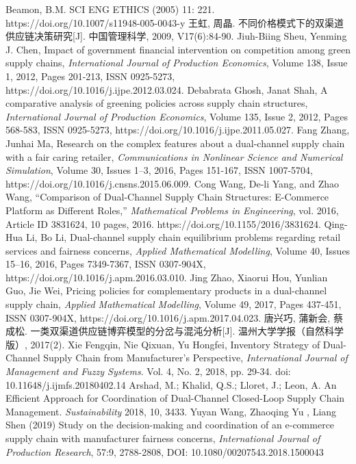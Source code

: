 \documentclass{article}
\begin{document}
\begin{thebibliography}{1}
 Beamon, B.M. SCI ENG ETHICS (2005) 11: 221. https://doi.org/10.1007/s11948-005-0043-y
 王虹, 周晶. 不同价格模式下的双渠道供应链决策研究[J]. 中国管理科学, 2009, V17(6):84-90.
 Jiuh-Biing Sheu, Yenming J. Chen, Impact of government financial intervention on competition among green supply chains, \emph{International Journal of Production Economics}, Volume 138, Issue 1, 2012, Pages 201-213, ISSN 0925-5273, https://doi.org/10.1016/j.ijpe.2012.03.024.
 Debabrata Ghosh, Janat Shah, A comparative analysis of greening policies across supply chain structures, \emph{International Journal of Production Economics}, Volume 135, Issue 2, 2012, Pages 568-583, ISSN 0925-5273, https://doi.org/10.1016/j.ijpe.2011.05.027.
 Fang Zhang, Junhai Ma, Research on the complex features about a dual-channel supply chain with a fair caring retailer, \emph{Communications in Nonlinear Science and Numerical Simulation}, Volume 30, Issues 1–3, 2016, Pages 151-167, ISSN 1007-5704, https://doi.org/10.1016/j.cnsns.2015.06.009.
 Cong Wang, De-li Yang, and Zhao Wang, “Comparison of Dual-Channel Supply Chain Structures: E-Commerce Platform as Different Roles,” \emph{Mathematical Problems in Engineering}, vol. 2016, Article ID 3831624, 10 pages, 2016. https://doi.org/10.1155/2016/3831624.
 Qing-Hua Li, Bo Li, Dual-channel supply chain equilibrium problems regarding retail services and fairness concerns, \emph{Applied Mathematical Modelling}, Volume 40, Issues 15–16, 2016, Pages 7349-7367, ISSN 0307-904X, https://doi.org/10.1016/j.apm.2016.03.010.
 Jing Zhao, Xiaorui Hou, Yunlian Guo, Jie Wei, Pricing policies for complementary products in a dual-channel supply chain, \emph{Applied Mathematical Modelling}, Volume 49, 2017, Pages 437-451, ISSN 0307-904X, https://doi.org/10.1016/j.apm.2017.04.023.
 唐兴巧, 蒲新会, 蔡成松. 一类双渠道供应链博弈模型的分岔与混沌分析[J]. 温州大学学报（自然科学版）, 2017(2).
 Xie Fengqin, Nie Qixuan, Yu Hongfei, Inventory Strategy of Dual-Channel Supply Chain from Manufacturer's Perspective, \emph{International Journal of Management and Fuzzy Systems}. Vol. 4, No. 2, 2018, pp. 29-34. doi: 10.11648/j.ijmfs.20180402.14
 Arshad, M.; Khalid, Q.S.; Lloret, J.; Leon, A. An Efficient Approach for Coordination of Dual-Channel Closed-Loop Supply Chain Management. \emph{Sustainability} 2018, 10, 3433.
 Yuyan Wang, Zhaoqing Yu , Liang Shen (2019) Study on the decision-making and coordination of an e-commerce supply chain with manufacturer fairness concerns, \emph{International Journal of Production Research}, 57:9, 2788-2808, DOI: 10.1080/00207543.2018.1500043

\end{thebibliography}
\end{document}
